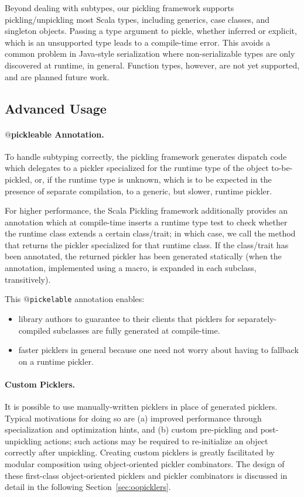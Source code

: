 \documentclass[preprint,10pt]{sigplanconf}
\theoremstyle{definition}
\theoremstyle{definition}
\newcommand{\term}[1]{\mbox{\texttt{#1}}}
\begin{document}
Beyond dealing with subtypes, our pickling framework supports
pickling/unpickling most Scala types, including generics, case classes, and
singleton objects. Passing a type argument to pickle, whether inferred or
explicit, which is an unsupported type leads to a compile-time error. This
avoids a common problem in Java-style serialization where non-serializable
types are only discovered at runtime, in general. Function types, however, are
not yet supported, and are planned future work.

\subsection{Advanced Usage}
\label{sec:pickleable-annotation}

\paragraph{$@$pickleable Annotation.} To handle subtyping correctly, the
pickling framework generates dispatch code which delegates to a pickler
specialized for the runtime type of the object to-be-pickled, or, if the
runtime type is unknown, which is to be expected in the presence of separate
compilation, to a generic, but slower, runtime pickler.

For higher performance, the Scala Pickling framework additionally provides an
annotation which at compile-time inserts a runtime type test to check whether
the runtime class extends a certain class/trait; in which case, we call the
method that returns the pickler specialized for that runtime class. If the
class/trait has been annotated, the returned pickler has been generated
statically (when the annotation, implemented using a macro, is expanded in
each subclass, transitively).

This \term{$@$pickelable} annotation enables:

\begin{itemize}
\item library authors to guarantee to their clients that picklers for separately-compiled
subclasses are fully generated at compile-time.

\item faster picklers in general because one need not worry about having to
fallback on a runtime pickler.
\end{itemize}

\paragraph{Custom Picklers.} It is possible to use manually-written picklers
in place of generated picklers. Typical motivations for doing so are (a)
improved performance through specialization and optimization hints, and (b) custom pre-pickling and post-unpickling
actions; such actions may be required to re-initialize an object
correctly after unpickling. Creating custom picklers is greatly facilitated by
modular composition using object-oriented pickler combinators. The design of
these first-class object-oriented picklers and pickler combinators is
discussed in detail in the following Section~\ref{sec:oopicklers}.
\end{document}

